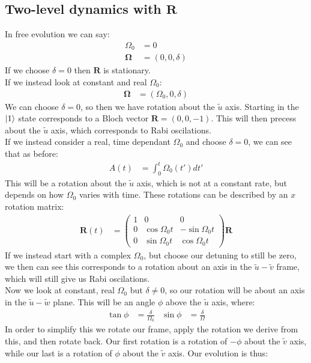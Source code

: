 \subsection{Two-level dynamics with $\bm{R}$}
In free evolution we can say:
\begin{align*}
	\Omega_0 &= 0 \\
	\bm{\Omega} &= (0,0,\delta)
\end{align*}
If we choose $\delta = 0$ then $\bm{R}$ is stationary.\\
If we instead look at constant and real $\Omega_0$:
\begin{align*}
	\bm{\Omega} &= (\Omega_0,0,\delta)
\end{align*}
We can choose $\delta = 0$, so then we have rotation about the $\tilde{u}$ axis. Starting in the $\ket{1}$ state corresponds to a Bloch vector $\bm{R} = (0,0,-1)$. This will then precess about the $\tilde{u}$ axis, which corresponds to Rabi oscilations. \\
If we instead consider a real, time dependant $\Omega_0$ and choose $\delta = 0$, we can see that as before:
\begin{align*}
	A(t) &= \int_0^t \Omega_0(t') dt'
\end{align*}
This will be a rotation about the $\tilde{u}$ axis, which is not at a constant rate, but depends on how $\Omega_0$ varies with time. These rotations can be described by an $x$ rotation matrix:
\begin{align*}
	\bm{R}(t) &= \begin{pmatrix}
		1 &0 &0 \\
		0 & \cos\Omega_0 t & -\sin\Omega_0 t \\
		0 & \sin\Omega_0t & \cos\Omega_0 t
	\end{pmatrix} \bm{R}
\end{align*}
If we instead start with a complex $\Omega_0$, but choose our detuning to still be zero, we then can see this corresponds to a rotation about an axis in the $\tilde{u}-\tilde{v}$ frame, which will still give us Rabi oscilations.\\
Now we look at constant, real $\Omega_0$ but $\delta \neq 0$, so our rotation will be about an axis in the $\tilde{u}-\tilde{w}$ plane. This will be an angle $\phi$ above the $\tilde{u}$ axis, where:
\begin{align*}
	\tan\phi &= \frac{\delta}{\Omega_0} & \sin\phi &= \frac{\delta}{\Omega}
\end{align*}
In order to simplify this we rotate our frame, apply the rotation we derive from this, and then rotate back. Our first rotation is a rotation of $-\phi$ about the $\tilde{v}$ axis, while our last is a rotation of $\phi$ about the $\tilde{v}$ axis. Our evolution is thus:
